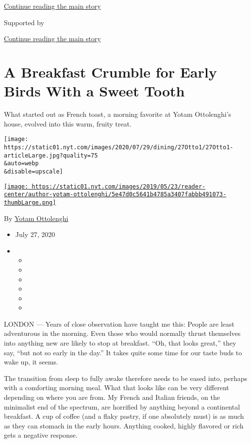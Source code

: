 \protect\hyperlink{after-top}{Continue reading the main story}

Supported by

\protect\hyperlink{after-sponsor}{Continue reading the main story}

\hypertarget{a-breakfast-crumble-for-early-birds-with-a-sweet-tooth}{%
\section{A Breakfast Crumble for Early Birds With a Sweet
Tooth}\label{a-breakfast-crumble-for-early-birds-with-a-sweet-tooth}}

What started out as French toast, a morning favorite at Yotam
Ottolenghi's house, evolved into this warm, fruity treat.

\texttt{[image: https://static01.nyt.com/images/2020/07/29/dining/27Otto1/27Otto1-articleLarge.jpg?quality=75\\\&auto=webp\\\&disable=upscale]}

\href{https://www.nytimes.com/by/yotam-ottolenghi}{\texttt{[image: https://static01.nyt.com/images/2019/05/23/reader-center/author-yotam-ottolenghi/5e47d0c5641b4785a3407fabbb491073-thumbLarge.png]}}

By \href{https://www.nytimes.com/by/yotam-ottolenghi}{Yotam Ottolenghi}

\begin{itemize}
\item
  July 27, 2020
\item
  \begin{itemize}
  \item
  \item
  \item
  \item
  \item
  \item
  \end{itemize}
\end{itemize}

LONDON --- Years of close observation have taught me this: People are
least adventurous in the morning. Even those who would normally thrust
themselves into anything new are likely to stop at breakfast. ``Oh, that
looks great,'' they say, ``but not so early in the day.'' It takes quite
some time for our taste buds to wake up, it seems.

The transition from sleep to fully awake therefore needs to be eased
into, perhaps with a comforting morning meal. What that looks like can
be very different depending on where you are from. My French and Italian
friends, on the minimalist end of the spectrum, are horrified by
anything beyond a continental breakfast. A cup of coffee (and a flaky
pastry, if one absolutely must) is as much as they can stomach in the
early hours. Anything cooked, highly flavored or rich gets a negative
response.

